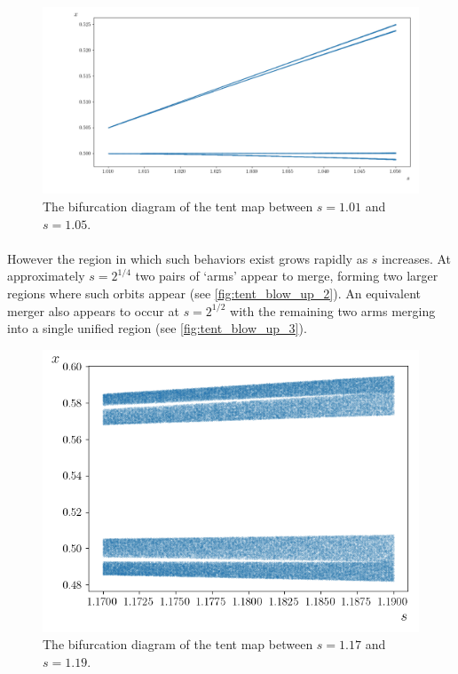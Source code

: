\documentclass{article}
\begin{document}
\begin{figure}[H]
    \centering
    \hspace{-0.5in}
    \includegraphics[scale = 0.5]{Figure_Tent_Map_Blowup.png}
	\caption{The bifurcation diagram of the tent map between $s = 1.01$ and $s = 1.05$.}
    \label{fig:tent_blow_up}
\end{figure}

\paragraph{}
However the region in which such behaviors exist grows rapidly as $s$ increases. At approximately 
$s = 2^{1/4}$ two pairs of `arms' appear to merge, forming two larger regions where such orbits 
appear (see \autoref{fig:tent_blow_up_2}). An equivalent merger also appears to occur at $s = 2^{1/2}$ with the remaining two 
arms merging into a single unified region (see \autoref{fig:tent_blow_up_3}).

\begin{figure}[H]
    \centering
    \hspace{-0.5in}
    \includegraphics[scale = 0.6]{Figure_Blow_Up_Two.png}
	\caption{The bifurcation diagram of the tent map between $s = 1.17$ and $s = 1.19$.}
    \label{fig:tent_blow_up_2}
\end{figure}
\end{document}
